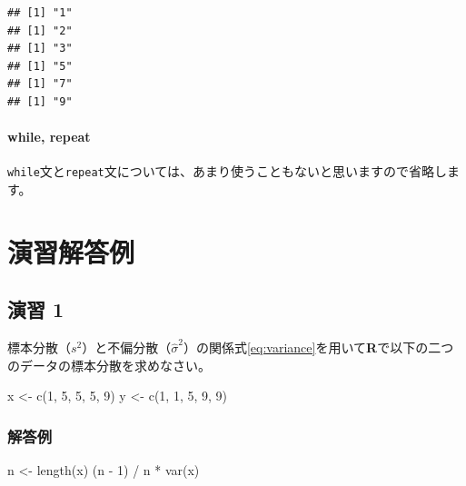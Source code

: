 \documentclass[
  12pt,
]{book}
\newenvironment{Shaded}{\begin{snugshade}}{\end{snugshade}}
\newcommand{\DecValTok}[1]{\textcolor[rgb]{0.00,0.00,0.81}{#1}}
\newcommand{\FunctionTok}[1]{\textcolor[rgb]{0.00,0.00,0.00}{#1}}
\newcommand{\NormalTok}[1]{#1}
\newcommand{\OtherTok}[1]{\textcolor[rgb]{0.56,0.35,0.01}{#1}}
\newcommand{\SpecialCharTok}[1]{\textcolor[rgb]{0.00,0.00,0.00}{#1}}
\begin{document}
\begin{verbatim}
## [1] "1"
## [1] "2"
## [1] "3"
## [1] "5"
## [1] "7"
## [1] "9"
\end{verbatim}

\hypertarget{while-repeat}{%
\subsubsection{while, repeat}\label{while-repeat}}

\texttt{while}文と\texttt{repeat}文については、あまり使うこともないと思いますので省略します。

\hypertarget{ux6f14ux7fd2ux89e3ux7b54ux4f8b}{%
\chapter{演習解答例}\label{ux6f14ux7fd2ux89e3ux7b54ux4f8b}}

\hypertarget{ux6f14ux7fd2-1-1}{%
\section*{演習 1}\label{ux6f14ux7fd2-1-1}}

標本分散（\(s^2\)）と不偏分散（\(\hat{\sigma}^2\)）の関係式\eqref{eq:variance}を用いて\textbf{R}で以下の二つのデータの標本分散を求めなさい。

\begin{Shaded}
\begin{Highlighting}[numbers=left,,]
\NormalTok{x }\OtherTok{\textless{}{-}} \FunctionTok{c}\NormalTok{(}\DecValTok{1}\NormalTok{, }\DecValTok{5}\NormalTok{, }\DecValTok{5}\NormalTok{, }\DecValTok{5}\NormalTok{, }\DecValTok{9}\NormalTok{)}
\NormalTok{y }\OtherTok{\textless{}{-}} \FunctionTok{c}\NormalTok{(}\DecValTok{1}\NormalTok{, }\DecValTok{1}\NormalTok{, }\DecValTok{5}\NormalTok{, }\DecValTok{9}\NormalTok{, }\DecValTok{9}\NormalTok{)}
\end{Highlighting}
\end{Shaded}

\hypertarget{ux89e3ux7b54ux4f8b}{%
\subsection*{解答例}\label{ux89e3ux7b54ux4f8b}}

\begin{Shaded}
\begin{Highlighting}[numbers=left,,]
\NormalTok{n }\OtherTok{\textless{}{-}} \FunctionTok{length}\NormalTok{(x)}
\NormalTok{(n }\SpecialCharTok{{-}} \DecValTok{1}\NormalTok{) }\SpecialCharTok{/}\NormalTok{ n }\SpecialCharTok{*} \FunctionTok{var}\NormalTok{(x)}
\end{Highlighting}
\end{Shaded}
\end{document}
